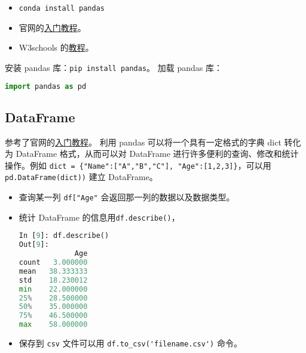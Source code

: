 
\begin{issues}
\issueDraft
\end{issues}

\begin{itemize}
\item \verb|conda install pandas|
\item 官网的\href{https://pandas.pydata.org/docs/getting_started/index.html}{入门教程}。
\item W3schools 的\href{https://www.w3schools.com/python/pandas/default.asp}{教程}。
\end{itemize}
安装 pandas 库：\verb|pip install pandas|。
加载 pandas 库：
\begin{lstlisting}[language=python]
import pandas as pd
\end{lstlisting}
\subsection{DataFrame}
参考了官网的\href{https://pandas.pydata.org/docs/getting_started/index.html}{入门教程}。
利用 pandas 可以将一个具有一定格式的字典 dict 转化为 DataFrame 格式，从而可以对 DataFrame 进行许多便利的查询、修改和统计操作。例如 \verb|dict = {"Name":["A","B","C"], "Age":[1,2,3]}|，可以用 \verb|pd.DataFrame(dict))| 建立 DataFrame。
\begin{itemize}
\item 查询某一列 \verb|df["Age"| 会返回那一列的数据以及数据类型。
\item 统计 DataFrame 的信息用\verb|df.describe()|，
\begin{lstlisting}[language=python]
In [9]: df.describe()
Out[9]: 
             Age
count   3.000000
mean   38.333333
std    18.230012
min    22.000000
25%    28.500000
50%    35.000000
75%    46.500000
max    58.000000
\end{lstlisting}
\item 保存到 \verb|csv| 文件可以用 \verb|df.to_csv('filename.csv')| 命令。
\end{itemize}
